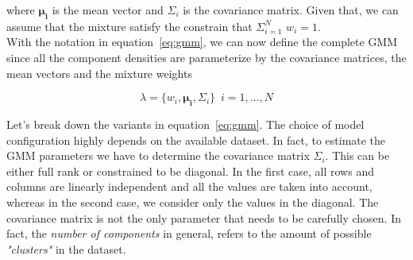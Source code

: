 \noindent where $\mathbf{\mu_{i}}$ is the mean vector and $\Sigma_{i}$ is the covariance matrix. Given that, we can assume that the mixture satisfy the constrain that $\Sigma_{i=1}^{N} \,\, w_{i} = 1$. \\

\noindent With the notation in equation~\ref{eq:gmm}, we can now define the complete GMM since all the component densities are parameterize by the covariance matrices, the mean vectors and the mixture weights \cite{reynolds2000speaker}

\begin{equation}
\label{eq:gmm}
	\lambda = \{ w_{i}, \mathbf{\mu_{i}}, \Sigma_{i}\} \,\,\, i = 1, ... , N
\end{equation}

\noindent Let's break down the variants in equation~\ref{eq:gmm}. The choice of model configuration highly depends on the available dataset. In fact, to estimate the GMM parameters we have to determine the covariance matrix $\Sigma_{i}$. This can be either full rank or constrained to be diagonal. In the first case, all rows and columns are linearly independent and all the values are taken into account, whereas in the second case, we consider only the values in the diagonal. The covariance matrix is not the only parameter that needs to be carefully chosen. In fact, the \textit{number of components} in general, refers to the amount of possible  \textit{"clusters"} in the dataset. \\


